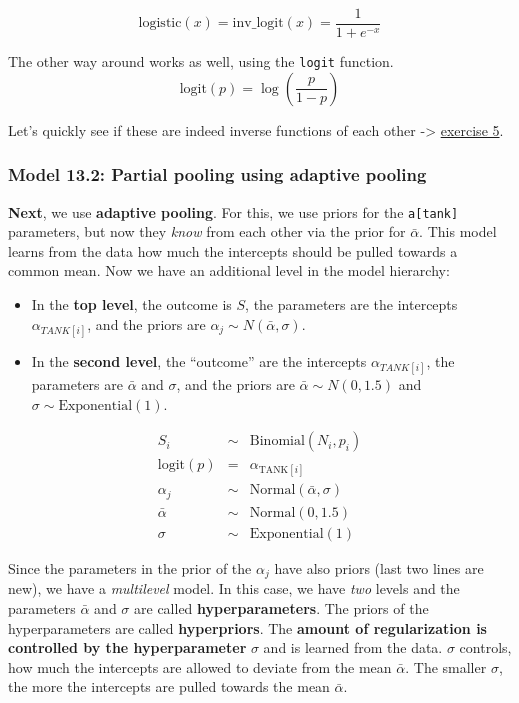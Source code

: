 \documentclass[
]{book}
\providecommand{\tightlist}{%
  \setlength{\itemsep}{0pt}\setlength{\parskip}{0pt}}
\begin{document}
\[
\mathrm{logistic}(x) = \mathrm{inv\_logit}(x) = \frac{1}{1 + e^{-x}}
\]

The other way around works as well, using the \texttt{logit} function.
\[\text{logit}(p) = \log\left( \frac{p}{1 - p} \right)\]

Let's quickly see if these are indeed inverse functions of each other -\textgreater{} \hyperref[exercise5_LMM]{exercise 5}.

\subsubsection{Model 13.2: Partial pooling using adaptive pooling}\label{model13_2}

\textbf{Next}, we use \textbf{adaptive pooling}. For this, we use priors for the \texttt{a{[}tank{]}} parameters,
but now they \emph{know} from each other via the prior for \(\bar{\alpha}\).
This model learns from the data how much the intercepts should be pulled towards a common mean.
Now we have an additional level in the model hierarchy:

\begin{itemize}
\tightlist
\item
  In the \textbf{top level}, the outcome is \(S\), the parameters are the intercepts
  \(\alpha_{TANK[i]}\),
  and the priors are \(\alpha_j \sim N(\bar{\alpha}, \sigma)\).
\item
  In the \textbf{second level}, the ``outcome'' are the intercepts \(\alpha_{TANK[i]}\),
  the parameters are \(\bar{\alpha}\) and \(\sigma\),
  and the priors are \(\bar{\alpha} \sim N(0, 1.5)\) and
  \(\sigma \sim \text{Exponential}(1)\).
\end{itemize}

\[
\begin{array}{rcl}
S_i &\sim& \text{Binomial}(N_i, p_i) \\
\text{logit}(p) &=& \alpha_{\text{TANK}[i]} \\
\alpha_j &\sim& \text{Normal}(\bar{\alpha}, \sigma)\\
\bar{\alpha} &\sim& \text{Normal}(0, 1.5)\\
\sigma &\sim& \text{Exponential}(1)
\end{array}
\]

Since the parameters in the prior of the \(\alpha_j\) have also priors
(last two lines are new), we have a \emph{multilevel} model.
In this case, we have \emph{two} levels and the parameters
\(\bar{\alpha}\) and \(\sigma\) are called \textbf{hyperparameters}.
The priors of the hyperparameters are called \textbf{hyperpriors}.
The \textbf{amount of regularization is controlled by the hyperparameter} \(\sigma\) and is
learned from the data. \(\sigma\) controls, how much the intercepts are
allowed to deviate from the mean \(\bar{\alpha}\). The smaller \(\sigma\),
the more the intercepts are pulled towards the mean \(\bar{\alpha}\).
\end{document}
